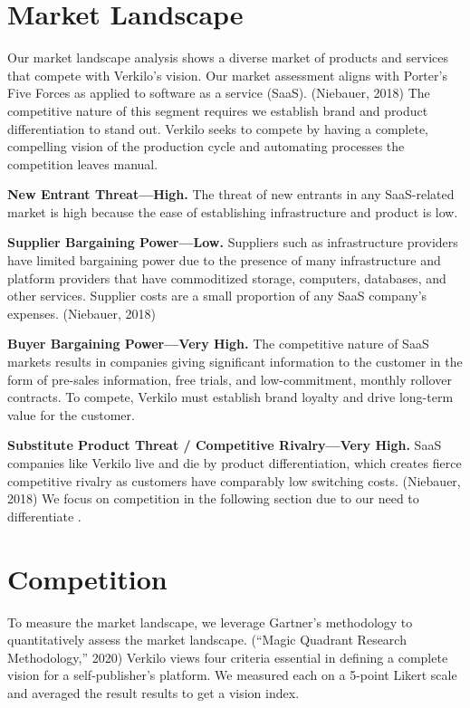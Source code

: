 \documentclass[11pt,openany]{book}
\begin{document}
\newpage

\hypertarget{market-landscape}{%
\section{Market Landscape}\label{market-landscape}}

Our market landscape analysis shows a diverse market of products and
services that compete with Verkilo's vision. Our market assessment
aligns with Porter's Five Forces as applied to software as a service
(SaaS). (Niebauer, 2018) The competitive nature of this segment requires
we establish brand and product differentiation to stand out. Verkilo
seeks to compete by having a complete, compelling vision of the
production cycle and automating processes the competition leaves manual.

\textbf{New Entrant Threat---High.} The threat of new entrants in any
SaaS-related market is high because the ease of establishing
infrastructure and product is low.

\textbf{Supplier Bargaining Power---Low.} Suppliers such as
infrastructure providers have limited bargaining power due to the
presence of many infrastructure and platform providers that have
commoditized storage, computers, databases, and other services. Supplier
costs are a small proportion of any SaaS company's expenses. (Niebauer,
2018)

\textbf{Buyer Bargaining Power---Very High.} The competitive nature of
SaaS markets results in companies giving significant information to the
customer in the form of pre-sales information, free trials, and
low-commitment, monthly rollover contracts. To compete, Verkilo must
establish brand loyalty and drive long-term value for the customer.

\textbf{Substitute Product Threat / Competitive Rivalry---Very High.}
SaaS companies like Verkilo live and die by product differentiation,
which creates fierce competitive rivalry as customers have comparably
low switching costs. (Niebauer, 2018) We focus on competition in the
following section due to our need to differentiate .

\newpage

\hypertarget{competition}{%
\section{Competition}\label{competition}}

To measure the market landscape, we leverage Gartner's methodology to
quantitatively assess the market landscape. (``Magic Quadrant Research
Methodology,'' 2020) Verkilo views four criteria essential in defining a
complete vision for a self-publisher's platform. We measured each on a
5-point Likert scale and averaged the result results to get a vision
index.
\end{document}
